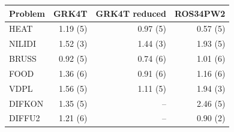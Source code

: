 \begin{tabular}{lrrr}
\toprule
Problem & GRK4T & GRK4T reduced & ROS34PW2 \\
\midrule
HEAT & 1.19 (5) & 0.97 (5) & 0.57 (5) \\
NILIDI & 1.52 (3) & 1.44 (3) & 1.93 (5) \\
BRUSS & 0.92 (5) & 0.74 (6) & 1.01 (6) \\
FOOD & 1.36 (6) & 0.91 (6) & 1.16 (6) \\
VDPL & 1.56 (5) & 1.11 (5) & 1.94 (3) \\
DIFKON & 1.35 (5) & -- & 2.46 (5) \\
DIFFU2 & 1.21 (6) & -- & 0.90 (2) \\
\bottomrule
\end{tabular}
